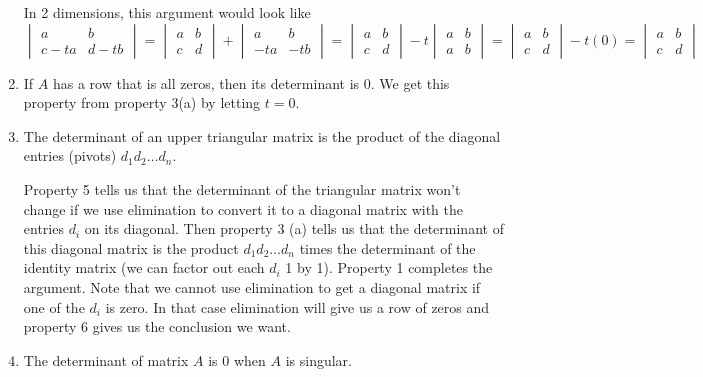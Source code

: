 \documentclass[11pt]{article}
\begin{document}
\begin{enumerate}
    In 2 dimensions, this argument would look like 
    \[
    \begin{vmatrix}
        a & b \\
        c - ta & d - tb 
    \end{vmatrix}  = 
    \begin{vmatrix}
        a & b \\
        c & d 
    \end{vmatrix} + 
    \begin{vmatrix}
        a & b \\
        -ta & -tb 
    \end{vmatrix} = 
    \begin{vmatrix}
        a & b \\
        c & d 
    \end{vmatrix} - 
    t \begin{vmatrix}
        a & b \\
        a & b 
    \end{vmatrix} = 
    \begin{vmatrix}
        a & b \\
        c & d 
    \end{vmatrix} - 
    t (0) = 
    \begin{vmatrix}
        a & b \\
        c & d 
    \end{vmatrix}
    \]
    \item If $A$ has a row that is all zeros, then its determinant is 0. 
    We get this property from property 3(a) by letting $t=0$.
    \item  The determinant of an upper triangular matrix is the product of the diagonal 
    entries (pivots) \(d_1 d_2 \ldots d_n\).

    Property 5 tells us that the determinant of the triangular matrix won't change if we use 
    elimination to convert it to a diagonal matrix with the entries $d_i$ on its diagonal. 
    Then property 3 (a) tells us that the determinant of this diagonal matrix is the product 
    \(d_1 d_2 \ldots d_n\) times the determinant of the identity matrix (we can factor out
    each $d_i$ 1 by 1). Property 1 completes the argument. Note that we cannot use elimination 
    to get a diagonal matrix if one of the $d_i$ is zero. In that case elimination will give 
    us a row of zeros and property 6 gives us the conclusion we want. 
    \item The determinant of matrix $A$ is 0 when $A$ is singular. 
    

\end{enumerate}
\end{document}
